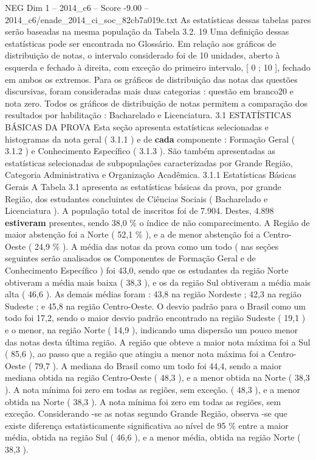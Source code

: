 \begin{textsample}{NEG Dim 1 – 2014\_c6 – Score -9.00 – 2014\_c6/enade\_2014\_ci\_soc\_82cb7a019c.txt}
As estatísticas dessas tabelas pares serão baseadas na mesma população da Tabela 3.2. 19 Uma definição dessas estatísticas pode ser encontrada no Glossário.
Em relação aos gráficos de distribuição de notas, o intervalo considerado foi de 10 unidades, aberto à esquerda e fechado à direita, com exceção do primeiro intervalo, [ 0 ; 10 ], fechado em ambos os extremos.
Para os gráficos de distribuição das notas das questões discursivas, foram consideradas mais duas categorias : questão em branco20 e nota zero.
Todos os gráficos de distribuição de notas permitem a comparação dos resultados por habilitação : Bacharelado e Licenciatura. 3.1 ESTATÍSTICAS BÁSICAS DA PROVA Esta seção apresenta estatísticas selecionadas e histogramas da nota geral ( 3.1.1 ) e de \textbf{cada} componente : Formação Geral ( 3.1.2 ) e Conhecimento Específico ( 3.1.3 ).
São também apresentadas as estatísticas selecionadas de subpopulações caracterizadas por Grande Região, Categoria Administrativa e Organização Acadêmica. 3.1.1 Estatísticas Básicas Gerais A Tabela 3.1 apresenta as estatísticas básicas da prova, por grande Região, dos estudantes concluintes de Ciências Sociais ( Bacharelado e Licenciatura ).
A população total de inscritos foi de 7.904.
Destes, 4.898 \textbf{estiveram} presentes, sendo 38,0 \% o índice de não comparecimento.
A Região de maior abstenção foi a Norte ( 52,1 \% ), e a de menor abstenção foi a Centro-Oeste ( 24,9 \% ).
A média das notas da prova como um todo ( nas seções seguintes serão analisados os Componentes de Formação Geral e de Conhecimento Específico ) foi 43,0, sendo que os estudantes da região Norte obtiveram a média mais baixa ( 38,3 ), e os da região Sul obtiveram a média mais alta ( 46,6 ).
As demais médias foram : 43,8 na região Nordeste ; 42,3 na região Sudeste ; e 45,8 na região Centro-Oeste.
O desvio padrão para o Brasil como um todo foi 17,2, sendo o maior desvio padrão encontrado na região Sudeste ( 19,1 ) e o menor, na região Norte ( 14,9 ), indicando uma dispersão um pouco menor das notas desta última região.
A região que obteve a maior nota máxima foi a Sul ( 85,6 ), ao passo que a região que atingiu a menor nota máxima foi a Centro-Oeste ( 79,7 ).
A mediana do Brasil como um todo foi 44,4, sendo a maior mediana obtida na região Centro-Oeste ( 48,3 ), e a menor obtida na Norte ( 38,3 ).
A nota mínima foi zero em todas as regiões, sem exceção. ( 48,3 ), e a menor obtida na Norte ( 38,3 ).
A nota mínima foi zero em todas as regiões, sem exceção.
Considerando -se as notas segundo Grande Região, observa -se que existe diferença estatisticamente significativa ao nível de 95 \% entre a maior média, obtida na região Sul ( 46,6 ), e a menor média, obtida na região Norte ( 38,3 ).

\end{textsample}

